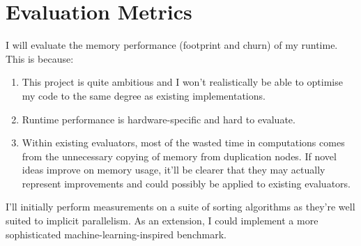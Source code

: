 \documentclass{article}
\begin{document}
\section{Evaluation Metrics}
I will evaluate the memory performance (footprint and churn) of my runtime. This is because:
\begin{enumerate}
    \item This project is quite ambitious and I won't realistically be able to optimise my code to the same degree as existing implementations.
    \item Runtime performance is hardware-specific and hard to evaluate.
    \item Within existing evaluators, most of the wasted time in computations comes from the unnecessary copying of memory from duplication nodes. If novel ideas improve on memory usage, it'll be clearer that they may actually represent improvements and could possibly be applied to existing evaluators.
\end{enumerate}

I'll initially perform measurements on a suite of sorting algorithms as they're well suited to implicit parallelism. As an extension, I could implement a more sophisticated machine-learning-inspired benchmark.
\end{document}
